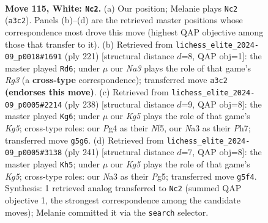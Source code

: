 \documentclass[11pt]{article}
\begin{document}
\clearpage

\begin{figure}[p]\centering
\begin{subfigure}{0.46\textwidth}\centering
\resizebox{\linewidth}{!}{%
\newchessgame
\chessboard[
  setfen={8/5R2/8/3k2K1/6P1/N6r/8/8 w - - 13 115},
  showmover=false,
  pgfstyle=straightmove, color=movearrow, markmove={a3-c2}
]}
\caption{}
\end{subfigure}\hfill
\begin{subfigure}{0.46\textwidth}\centering
\resizebox{\linewidth}{!}{%
\newchessgame
\chessboard[
  setfen={8/3R4/6r1/2pk4/8/2K5/8/8 b - - 19 111},
  showmover=false,
  pgfstyle=straightmove, color=movearrow, markmove={g6-d6}
]}
\caption{}
\end{subfigure}
\\[4pt]
\begin{subfigure}{0.46\textwidth}\centering
\resizebox{\linewidth}{!}{%
\newchessgame
\chessboard[
  setfen={7r/R6P/8/3k1NK1/8/8/8/8 w - - 3 120},
  showmover=false,
  pgfstyle=straightmove, color=movearrow, markmove={g5-g6}
]}
\caption{}
\end{subfigure}\hfill
\begin{subfigure}{0.46\textwidth}\centering
\resizebox{\linewidth}{!}{%
\newchessgame
\chessboard[
  setfen={8/8/8/R5p1/6k1/8/7r/5K2 b - - 5 121},
  showmover=false,
  pgfstyle=straightmove, color=movearrow, markmove={g4-h5}
]}
\caption{}
\end{subfigure}
\caption{\textbf{Move 115, White: \texttt{Nc2}.} (a) Our position; Melanie plays \texttt{Nc2} (\texttt{a3c2}). Panels (b)--(d) are the retrieved master positions whose correspondence most drove this move (highest QAP objective among those that transfer to it). (b) Retrieved from \texttt{lichess\_elite\_2024-09\_p0018\#1691} (ply 221) [structural distance $d$=8, QAP obj=1]: the master played \texttt{Rd6}; under $\mu$ our \emph{Na3} plays the role of that game's \emph{Rg3} (a \textbf{cross-type} correspondence); transferred move \texttt{a3c2} \textbf{(endorses this move)}. (c) Retrieved from \texttt{lichess\_elite\_2024-09\_p0005\#2214} (ply 238) [structural distance $d$=9, QAP obj=8]: the master played \texttt{Kg6}; under $\mu$ our \emph{Kg5} plays the role of that game's \emph{Kg5}; cross-type roles: our \emph{P}g4 as their \emph{N}f5, our \emph{N}a3 as their \emph{P}h7; transferred move \texttt{g5g6}. (d) Retrieved from \texttt{lichess\_elite\_2024-09\_p0005\#3138} (ply 241) [structural distance $d$=7, QAP obj=8]: the master played \texttt{Kh5}; under $\mu$ our \emph{Kg5} plays the role of that game's \emph{Kg5}; cross-type roles: our \emph{N}a3 as their \emph{P}g5; transferred move \texttt{g5f4}. Synthesis: 1 retrieved analog transferred to \texttt{Nc2} (summed QAP objective 1, the strongest correspondence among the candidate moves); Melanie committed it via the \texttt{search} selector.}
\label{fig:thought-m228}
\end{figure}
\end{document}
